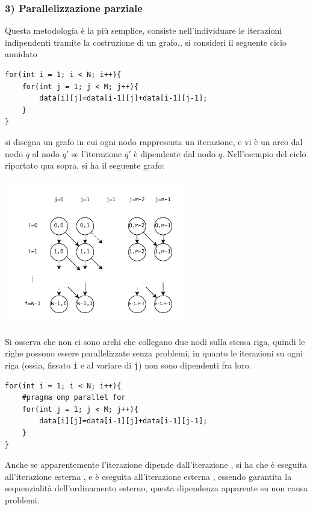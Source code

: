 \documentclass[10pt, letterpaper]{report}
\begin{document}
\subsubsection{3) Parallelizzazione parziale}
Questa metodologia è la più semplice, consiste nell'individuare le iterazioni indipendenti tramite la costruzione di un grafo., si consideri il seguente ciclo annidato 
\begin{lstlisting}[style=CStyle]
for(int i = 1; i < N; i++){
    for(int j = 1; j < M; j++){
        data[i][j]=data[i-1][j]+data[i-1][j-1];
    }
}
\end{lstlisting}
si disegna un grafo in cui ogni nodo rappresenta un iterazione, e vi è un arco dal nodo $q$ al nodo $q'$ se l'iterazione $q'$ è dipendente dal nodo $q$. Nell'esempio del ciclo riportato qua sopra, si ha il seguente grafo:\begin{center}
    \includegraphics[width=0.6\textwidth ]{images/grafoIterazioni.drawio.pdf}
\end{center}
Si osserva che non ci sono archi che collegano due nodi sulla stessa riga, quindi le righe possono essere parallelizzate senza problemi, in quanto le iterazioni su ogni riga (ossia, fissato \texttt{i} e al variare di \texttt{j}) non sono dipendenti fra loro.
\begin{lstlisting}[style=CStyle]
for(int i = 1; i < N; i++){
    #pragma omp parallel for 
    for(int j = 1; j < M; j++){
        data[i][j]=data[i-1][j]+data[i-1][j-1];
    }
}
\end{lstlisting}
Anche se apparentemente l'iterazione  dipende dall'iterazione , si ha che  è eseguita all'iterazione esterna , e   è eseguita all'iterazione esterna , essendo garantita la sequenzialità dell'ordinamento esterno, questa dipendenza apparente su  non causa problemi.
\end{document}
